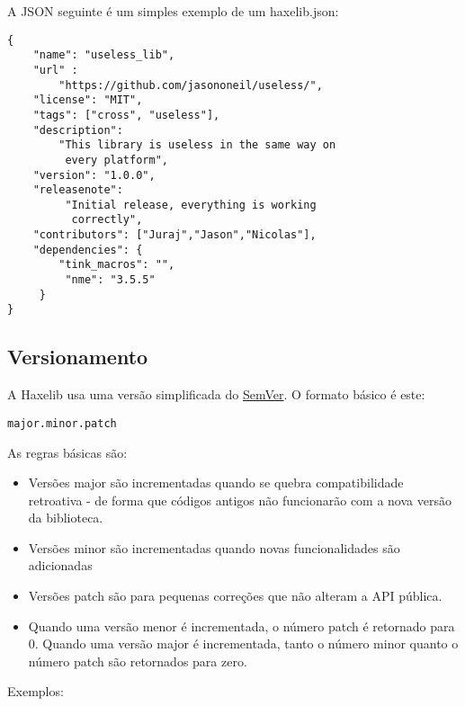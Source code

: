 {A JSON seguinte é um simples exemplo de um haxelib.json:

\begin{lstlisting}
{
    "name": "useless_lib",
    "url" :
        "https://github.com/jasononeil/useless/",
    "license": "MIT",
    "tags": ["cross", "useless"],
    "description":
        "This library is useless in the same way on
         every platform",
    "version": "1.0.0",
    "releasenote":
         "Initial release, everything is working
          correctly",
    "contributors": ["Juraj","Jason","Nicolas"],
    "dependencies": {
        "tink_macros": "",
         "nme": "3.5.5"
     }
}
\end{lstlisting}

\subsection{Versionamento}
\label{haxelib-json-versioning}

A Haxelib usa uma versão simplificada do \href{(http://semver.org)}{SemVer}. O formato básico é este:

\begin{lstlisting}
major.minor.patch
\end{lstlisting}

As regras básicas são:

\begin{itemize}
    \item Versões major são incrementadas quando se quebra compatibilidade retroativa - de forma que códigos antigos não funcionarão com a nova versão da biblioteca.
    \item Versões minor são incrementadas quando novas funcionalidades são adicionadas
    \item Versões patch são para pequenas correções que não alteram a API pública. 
    \item Quando uma versão menor é incrementada, o número patch é retornado para 0. Quando uma versão major é incrementada, tanto o número minor quanto o número patch são retornados para zero.
\end{itemize}

Exemplos:

}
